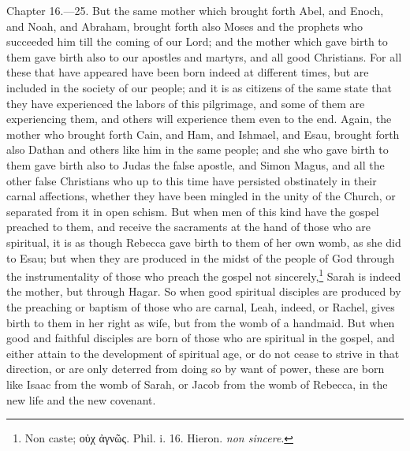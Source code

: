 Chapter 16.—25. But the same mother which brought forth Abel, and Enoch, and Noah, and Abraham, brought forth also Moses and the prophets who succeeded him till the coming of our Lord; and the mother which gave birth to them gave birth also to our apostles and martyrs, and all good Christians. For all these that have appeared have been born indeed at different times, but are included in the society of our people; and it is as citizens of the same state that they have experienced the labors of this pilgrimage, and some of them are experiencing them, and others will experience them even to the end. Again, the mother who brought forth Cain, and Ham, and Ishmael, and Esau, brought forth also Dathan and others like him in the same people; and she who gave birth to them gave birth also to Judas the false apostle, and Simon Magus, and all the other false Christians who up to this time have persisted obstinately in their carnal affections, whether they have been mingled in the unity of the Church, or separated from it in open schism. But when men of this kind have the gospel preached to them, and receive the sacraments at the hand of those who are spiritual, it is as though Rebecca gave birth to them of her own womb, as she did to Esau; but when they are produced in the midst of the people of God through the instrumentality of those who preach the gospel not sincerely,\footnote{\par  Non caste; \textgreek{οὐχ ἀγνῶς}. Phil. i. 16. Hieron. \emph{ non sincere}.} Sarah is indeed the mother, but through Hagar. So when good spiritual disciples are produced by the preaching or baptism of those who are carnal, Leah, indeed, or Rachel, gives birth to them in her right as wife, but from the womb of a handmaid. But when good and faithful disciples are born of those who are spiritual in the gospel, and either attain to the development of spiritual age, or do not cease to strive in that direction, or are only deterred from doing so by want of power, these are born like Isaac from the womb of Sarah, or Jacob from the womb of Rebecca, in the new life and the new covenant.


